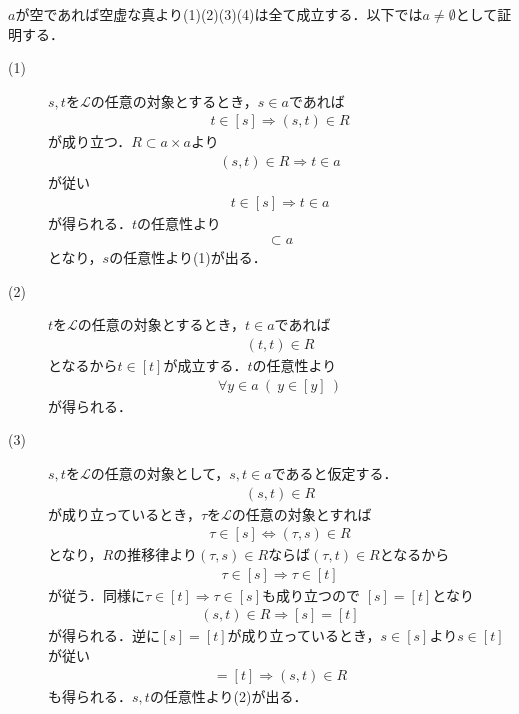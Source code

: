 	\begin{prf} $a$が空であれば空虚な真より(1)(2)(3)(4)は全て成立する．以下では$a \neq \emptyset$として証明する．
		\begin{description}
			\item[(1)] $s,t$を$\mathcal{L}$の任意の対象とするとき，$s \in a$であれば
				\begin{align}
					t \in [s] \Longrightarrow (s,t) \in R
				\end{align}
				が成り立つ．$R \subset a \times a$より
				\begin{align}
					(s,t) \in R \Longrightarrow t \in a
				\end{align}
				が従い
				\begin{align}
					t \in [s] \Longrightarrow t \in a
				\end{align}
				が得られる．$t$の任意性より
				\begin{align}
					[s] \subset a
				\end{align}
				となり，$s$の任意性より(1)が出る．
				
			\item[(2)] $t$を$\mathcal{L}$の任意の対象とするとき，$t \in a$であれば
				\begin{align}
					(t,t) \in R
				\end{align}
				となるから$t \in [t]$が成立する．$t$の任意性より
				\begin{align}
					\forall y \in a\ \left(\ y \in [y]\ \right)
				\end{align}
				が得られる．
				
			\item[(3)] $s,t$を$\mathcal{L}$の任意の対象として，$s,t \in a$であると仮定する．
				\begin{align}
					(s,t) \in R
				\end{align}
				が成り立っているとき，$\tau$を$\mathcal{L}$の任意の対象とすれば
				\begin{align}
					\tau \in [s] \Longleftrightarrow (\tau,s) \in R
				\end{align}
				となり，$R$の推移律より$(\tau,s) \in R$ならば$(\tau,t) \in R$となるから
				\begin{align}
					\tau \in [s] \Longrightarrow \tau \in [t]
				\end{align}
				が従う．同様に$\tau \in [t] \Longrightarrow \tau \in [s]$も成り立つので
				$[s] = [t]$となり
				\begin{align}
					(s,t) \in R \Longrightarrow [s] = [t]
				\end{align}
				が得られる．逆に$[s] = [t]$が成り立っているとき，$s \in [s]$より$s \in [t]$が従い
				\begin{align}
					[s] = [t] \Longrightarrow (s,t) \in R
				\end{align}
				も得られる．$s,t$の任意性より(2)が出る．
			

\end{description}
\end{prf}
